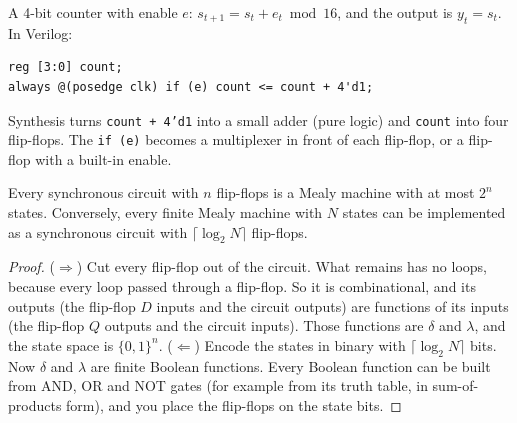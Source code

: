 \begin{center}
\end{center}

\begin{example}[A counter]
A 4-bit counter with enable $e$: $s_{t+1} = s_t + e_t \bmod 16$, and the
output is $y_t = s_t$. In Verilog:
\begin{verbatim}
reg [3:0] count;
always @(posedge clk) if (e) count <= count + 4'd1;
\end{verbatim}
Synthesis turns \texttt{count + 4'd1} into a small adder (pure logic) and
\texttt{count} into four flip-flops. The \texttt{if (e)} becomes a multiplexer
in front of each flip-flop, or a flip-flop with a built-in enable.
\end{example}

\begin{proposition}\label{prop:mealy}
Every synchronous circuit with $n$ flip-flops is a Mealy machine with at most
$2^n$ states. Conversely, every finite Mealy machine with $N$ states can be
implemented as a synchronous circuit with $\lceil\log_2 N\rceil$ flip-flops.
\end{proposition}
\begin{proof}
($\Rightarrow$) Cut every flip-flop out of the circuit. What remains has no
loops, because every loop passed through a flip-flop. So it is
combinational, and its outputs (the flip-flop $D$ inputs and the circuit
outputs) are functions of its inputs (the flip-flop $Q$ outputs and the
circuit inputs). Those functions are $\delta$ and $\lambda$, and the state
space is $\{0,1\}^n$.
($\Leftarrow$) Encode the states in binary with $\lceil\log_2 N\rceil$ bits.
Now $\delta$ and $\lambda$ are finite Boolean functions. Every Boolean
function can be built from AND, OR and NOT gates (for example from its
truth table, in sum-of-products form), and you place the flip-flops on the
state bits.
\end{proof}


